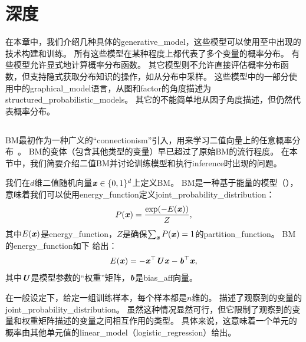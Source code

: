 \chapter{深度}
\label{chap:deep_generative_models}
在本章中，我们介绍几种具体的\gls{generative_model}，这些模型可以使用至中出现的技术构建和训练。
所有这些模型在某种程度上都代表了多个变量的概率分布。
有些模型允许显式地计算概率分布函数。
其它模型则不允许直接评估概率分布函数，但支持隐式获取分布知识的操作，如从分布中采样。
这些模型中的一部分使用中的\gls{graphical_model}语言，从图和\gls{factor}的角度描述为\gls{structured_probabilistic_models}。
其它的不能简单地从因子角度描述，但仍然代表概率分布。


\section{}
\label{sec:boltzmann_machines}
\gls{BM}最初作为一种广义的``\gls{connectionism}''引入，用来学习二值向量上的任意概率分布~\citep{Fahlman83,Ackley85,Hinton-Boltzmann,Hinton86a}。
\gls{BM}的变体（包含其他类型的变量）早已超过了原始\gls{BM}的流行程度。
在本节中，我们简要介绍二值\gls{BM}并讨论训练模型和执行\gls{inference}时出现的问题。

我们在$d$维二值随机向量$\boldsymbol{\mathit{x}} \in \{0, 1\}^d$上定义\gls{BM}。
\gls{BM}是一种基于能量的模型（），意味着我们可以使用\gls{energy_function}定义\gls{joint_probability_distribution}：
\begin{align}\label{eq:201px}
 P(\boldsymbol{\mathit{x}}) = \frac{\exp(-E(\boldsymbol{\mathit{x}}))}{Z},
\end{align}
其中$E(\boldsymbol{\mathit{x}})$是\gls{energy_function}，$Z$是确保$\sum_{\boldsymbol{\mathit{x}}} P(\boldsymbol{\mathit{x}})=1$的\gls{partition_function}。
\gls{BM}的\gls{energy_function}如下
给出：
\begin{align}\label{eq:202E}
 E(\boldsymbol{\mathit{x}}) = -\boldsymbol{\mathit{x}}^\top \boldsymbol{\mathit{U}} \boldsymbol{\mathit{x}} - \boldsymbol{\mathit{b}}^\top \boldsymbol{\mathit{x}},
\end{align}
其中$\boldsymbol{\mathit{U}}$是模型参数的``权重''矩阵，$\boldsymbol{\mathit{b}}$是\gls{bias_aff}向量。


在一般设定下，给定一组训练样本，每个样本都是$n$维的。
描述了观察到的变量的\gls{joint_probability_distribution}。
虽然这种情况显然可行，但它限制了观察到的变量和权重矩阵描述的变量之间相互作用的类型。
具体来说，这意味着一个单元的概率由其他单元值的\gls{linear_model}（\gls{logistic_regression}）给出。

